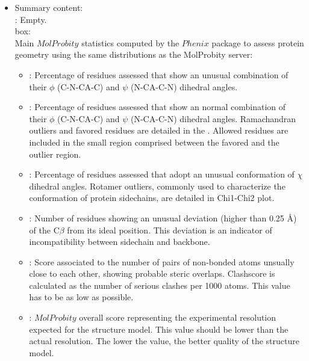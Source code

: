 \begin{itemize}
 \item Summary content:\\
    : Empty.\\
     box:\\Main $MolProbity$ statistics computed by the $Phenix$ package to assess protein geometry using the same distributions as the MolProbity server:
      \begin{itemize}     
        \item {}: Percentage of residues assessed that show an unusual combination of their $\phi$ (C-N-CA-C) and $\psi$ (N-CA-C-N) dihedral angles.
        \item {}: Percentage of residues assessed that show an normal combination of their $\phi$ (C-N-CA-C) and $\psi$ (N-CA-C-N) dihedral angles. Ramachandran outliers and favored residues are detailed in the . Allowed residues are included in the small region comprised between the favored and the outlier region.
        \item {}: Percentage of residues assessed that adopt an unusual conformation of $\chi$ dihedral angles. Rotamer outliers, commonly used to characterize the conformation of protein sidechains, are detailed in Chi1-Chi2 plot.
        \item {}: Number of residues showing an unusual deviation (higher than 0.25 \AA) of the C{$\beta$} from its ideal position. This deviation is an indicator of incompatibility between sidechain and backbone. 
        \item {}: Score associated to the number of pairs of non-bonded atoms unsually close to each other, showing probable steric overlaps. Clashscore is calculated as the number of serious clashes per 1000 atoms. This value has to be as low as possible.
        \item {}: $MolProbity$ overall score representing the experimental resolution expected for the structure model. This value should be lower than the actual resolution. The lower the value, the better quality of the structure model.
      \end{itemize}

\end{itemize}
